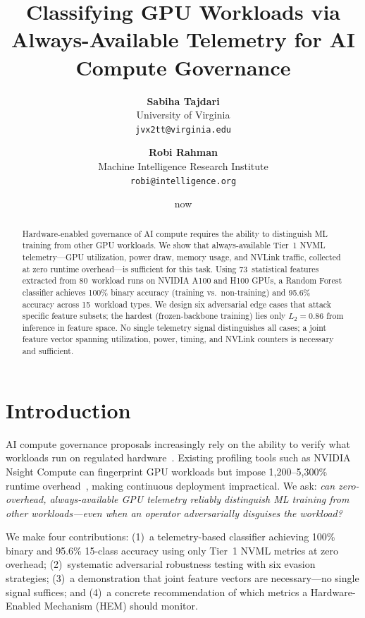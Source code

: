 \documentclass[midterm]{sparreport}
\title{Classifying GPU Workloads via Always-Available Telemetry for AI Compute Governance}
\author{
  \textbf{Sabiha Tajdari}\\
  University of Virginia\\
  \texttt{jvx2tt@virginia.edu}
  \and
  \textbf{Robi Rahman}\\
  Machine Intelligence Research Institute\\
  \texttt{robi@intelligence.org}
}
\date{now}
\begin{document}
\maketitle

\begin{abstract}
Hardware-enabled governance of AI compute requires the ability to distinguish ML training from other GPU workloads.
We show that always-available Tier~1 NVML telemetry---GPU utilization, power draw, memory usage, and NVLink traffic, collected at zero runtime overhead---is sufficient for this task.
Using 73~statistical features extracted from 80~workload runs on NVIDIA A100 and H100 GPUs, a Random Forest classifier achieves 100\% binary accuracy (training vs.\ non-training) and 95.6\% accuracy across 15~workload types.
We design six adversarial edge cases that attack specific feature subsets; the hardest (frozen-backbone training) lies only $L_2=0.86$ from inference in feature space.
No single telemetry signal distinguishes all cases; a joint feature vector spanning utilization, power, timing, and NVLink counters is necessary and sufficient.
\end{abstract}


\section{Introduction}

AI compute governance proposals increasingly rely on the ability to verify what workloads run on regulated hardware~\cite{aarne2024secure}.
Existing profiling tools such as NVIDIA Nsight Compute can fingerprint GPU workloads but impose 1{,}200--5{,}300\% runtime overhead~\cite{xu2026wave}, making continuous deployment impractical.
We ask: \emph{can zero-overhead, always-available GPU telemetry reliably distinguish ML training from other workloads---even when an operator adversarially disguises the workload?}

We make four contributions:
(1)~a telemetry-based classifier achieving 100\% binary and 95.6\% 15-class accuracy using only Tier~1 NVML metrics at zero overhead;
(2)~systematic adversarial robustness testing with six evasion strategies;
(3)~a demonstration that joint feature vectors are necessary---no single signal suffices; and
(4)~a concrete recommendation of which metrics a Hardware-Enabled Mechanism (HEM) should monitor.
\end{document}
